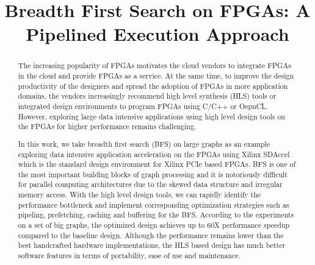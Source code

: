 \documentclass[sigconf]{acmart}
\begin{document}
\title{Breadth First Search on FPGAs: A Pipelined Execution Approach}


\author{     }
\affiliation{%
  \institution{   }
}
\email{       }




\begin{abstract}  
    The increasing popularity of FPGAs motivates the cloud vendors to integrate FPGAs in 
    the cloud and provide FPGAs as a service. At the same time, to improve the 
    design productivity of the designers and spread the adoption of FPGAs in 
    more application domains, the vendors increasingly recommend high level 
    synthesis (HLS) tools or integrated design environments 
    to program FPGAs using C/C++ or OepnCL. However, exploring large data intensive 
    applications using high level design tools on the FPGAs for higher performance 
    remains challenging.

    In this work, we take breadth first search (BFS) on large graphs as an example 
    exploring data intensive application acceleration on the FPGAs using
    Xilinx SDAccel which is the standard design environment for Xilinx PCIe 
    based FPGAs. BFS is one of the most 
    important building blocks of graph processing and it is notoriously difficult for 
    parallel computing architectures due to the skewed data structure and irregular 
    memory access. With the high level design tools, we can rapidly identify the 
    performance bottleneck and implement corresponding optimization strategies 
    such as pipeling, prefetching, caching and buffering for the BFS. 
    According to the experiments on a set of big graphs, the optimized design 
    achieves up to 60X performance speedup compared to the baseline design. 
    Although the performance remains lower than the best handcrafted hardware 
    implementations, the HLS based design has much better software features 
    in terms of portability, ease of use and maintenance.
 
\end{abstract}
\end{document}
